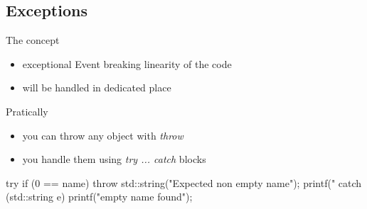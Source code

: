 \subsection[Exceptions]{Exceptions}

\begin{frame}[fragile]
  \begin{block}{The concept}
    \begin{itemize}
    \item exceptional Event breaking linearity of the code
    \item will be handled in dedicated place
    \end{itemize}
  \end{block}
  \begin{block}{Pratically}
    \begin{itemize}
    \item you can throw any object with {\it throw}
    \item you handle them using {\it try ... catch} blocks
    \end{itemize}
  \end{block}
  \begin{cppcode}
    try {
      if (0 == name) {
        throw std::string("Expected non empty name");
      }
      printf("%
    } catch (std::string e) {
      printf("empty name found\n");      
    }
  \end{cppcode}
\end{frame}

